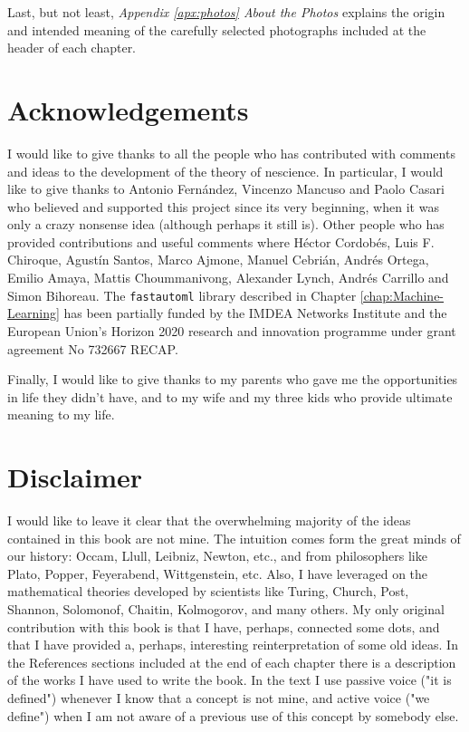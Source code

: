 Last, but not least, \emph{Appendix \ref{apx:photos} About the Photos} explains the origin and intended meaning of the carefully selected photographs included at the header of each chapter.

%
%

\section*{Acknowledgements}

I would like to give thanks to all the people who has contributed with comments and ideas to the development of the theory of nescience. In particular, I would like to give thanks to Antonio Fernández, Vincenzo Mancuso and Paolo Casari who believed and supported this project since its very beginning, when it was only a crazy nonsense idea (although perhaps it still is). Other people who has provided contributions and useful comments where Héctor Cordobés, Luis F. Chiroque, Agustín Santos, Marco Ajmone, Manuel Cebrián, Andrés Ortega, Emilio Amaya, Mattis Choummanivong, Alexander Lynch, Andrés Carrillo and Simon Bihoreau. The \texttt{fastautoml} library described in Chapter \ref{chap:Machine-Learning} has been partially funded by the IMDEA Networks Institute and the European Union's Horizon 2020 research and innovation programme under grant agreement No 732667 RECAP.

Finally, I would like to give thanks to my parents who gave me the opportunities in life they didn't have, and to my wife and my three kids who provide ultimate meaning to my life.

%
%

\section*{Disclaimer}

I would like to leave it clear that the overwhelming majority of the ideas contained in this book are not mine. The intuition comes form the great minds of our history: Occam, Llull, Leibniz, Newton, etc., and from philosophers like Plato, Popper, Feyerabend, Wittgenstein, etc. Also, I have leveraged on the mathematical theories developed by scientists like Turing, Church, Post, Shannon, Solomonof, Chaitin, Kolmogorov, and many others. My only original contribution with this book is that I have, perhaps, connected some dots, and that I have provided a, perhaps, interesting reinterpretation of some old ideas. In the References sections included at the end of each chapter there is a description of the works I have used to write the book. In the text I use passive voice ("it is defined") whenever I know that a concept is not mine, and active voice ("we define") when I am not aware of a previous use of this concept by somebody else.

